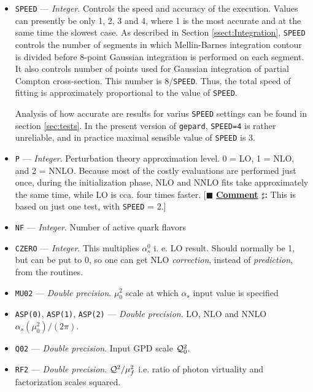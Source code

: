 \documentclass[12pt]{article}
\newcounter{comment}
\newcommand{\comminline}[1]{{%
\refstepcounter{comment}%
\ttfamily\small[$\blacksquare$ \textbf{\underline{Comment}
$\sharp$\thecomment:} #1]}}
\begin{document}
\begin{itemize}
\item
\texttt{SPEED} --- \emph{Integer}. Controls the speed and accuracy of the execution. Values can
presently be only 1, 2, 3 and 4, where 1 is the most accurate and at the
same time the slowest case.
As described in Section \ref{ssect:Integration}, \texttt{SPEED} controls the number
of segments in which Mellin-Barnes integration contour is divided before 8-point
Gaussian integration is performed on each segment. It also controls number of
points used for Gaussian integration of partial Compton cross-section. This
number is 8/\texttt{SPEED}.  Thus, the total speed of fitting is approximately
proportional to the
value of \texttt{SPEED}. 

Analysis of how accurate are results for varius \texttt{SPEED} settings can
be found in section \ref{sec:tests}. In the present version of \texttt{gepard},
\texttt{SPEED=4} is rather unreliable, and in practice maximal sensible
value of \texttt{SPEED} is 3.

\item
\texttt{P} --- \emph{Integer}. Perturbation theory approximation level. 0 = LO, 1 = NLO, and
  2 = NNLO. Because most of the costly evaluations are performed just once,
  during the initialization phase, NLO and NNLO fits take approximately the
  same time, while LO is cca. four times faster. \comminline{This is based
  on just one test, with \texttt{SPEED} = 2.}

\item
\texttt{NF} --- \emph{Integer}. Number of active quark flavors

\item
\texttt{CZERO} --- \emph{Integer}. This multiplies $\alpha_{s}^{0}$ i. e. LO result.
  Should normally be 1, but can be put to 0, so one can get NLO \emph{correction},
  instead of \emph{prediction}, from the routines.

\item
\texttt{MU02} --- \emph{Double precision}. $\mu_{0}^2$ scale at which
$\alpha_s$ input value is specified

\item
\texttt{ASP(0)}, \texttt{ASP(1)}, \texttt{ASP(2)} --- 
\emph{Double precision}. LO, NLO and NNLO $\alpha_{s}(\mu_{0}^2)/(2\pi)$.

\item
\texttt{Q02} --- \emph{Double precision}. Input GPD scale ${\cal Q}_{0}^2$.

\item
\texttt{RF2} --- \emph{Double precision}. $ {\cal Q}^2/{\mu_{f}^2}$ i.e. ratio
of photon virtuality and factorization scales squared.


\end{itemize}
\end{document}
